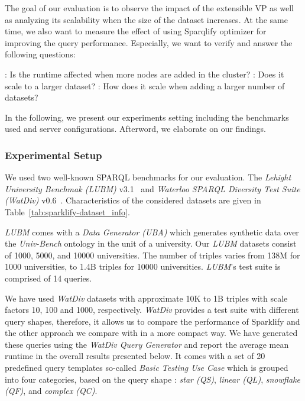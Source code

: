 The goal of our evaluation is to observe the impact of the extensible VP as well as analyzing its scalability when the size of the dataset increases.
At the same time, we also want to measure the effect of using Sparqlify optimizer for improving the query performance.
Especially, we want to verify and answer the following questions:
\begin{itemize}
\addtolength{\itemindent}{1cm}
    \newitem[Q1]\label{item:Q1}: Is the runtime affected when more nodes are added in the cluster?
    \newitem[Q2]\label{item:Q2}: Does it scale to a larger dataset?
    \newitem[Q3]\label{item:Q3}: How does it scale when adding a larger number of datasets?
\end{itemize}
In the following, we present our experiments setting including the benchmarks used and server configurations. 
Afterword, we elaborate on our findings.

\subsubsection{Experimental Setup}
We used two well-known SPARQL benchmarks for our evaluation. 
The \textit{Lehight University Benchmak (LUBM)} v3.1~\cite{Guo2005LUBMAB} and \textit{Waterloo SPARQL Diversity Test Suite (WatDiv)} v0.6~\cite{Alu2014DiversifiedST}.
Characteristics of the considered datasets are given in Table~\ref{tab:sparklify-dataset_info}.

\textit{LUBM} comes with a \textit{Data Generator (UBA)} which generates synthetic data over the \textit{Univ-Bench} ontology in the unit of a university.
Our \textit{LUBM} datasets consist of 1000, 5000, and 10000 universities.
The number of triples varies from 138M for 1000 universities, to 1.4B triples for 10000 universities.
\textit{LUBM}'s test suite is comprised of 14 queries.

We have used \textit{WatDiv} datasets with approximate 10K to 1B triples with scale factors 10, 100 and 1000, respectively. 
\textit{WatDiv} provides a test suite with different query shapes, therefore, it allows us to compare the performance of Sparklify and the other approach we compare with in a more compact way.
We have generated these queries using the \textit{WatDiv Query Generator} and report the average mean runtime in the overall results presented below.
It comes with a set of 20 predefined query templates so-called \textit{Basic Testing Use Case} which is grouped into four categories, based on the query shape : \textit{star (QS)}, \textit{linear (QL)}, \textit{snowflake (QF)}, and \textit{complex (QC)}.

